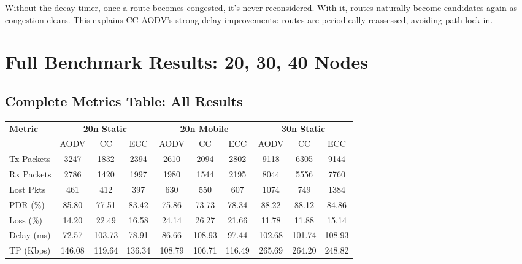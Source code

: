 \documentclass[12pt]{article}
\begin{document}
\noindent
Without the decay timer, once a route becomes congested, it's never reconsidered. With it, routes naturally become candidates again as congestion clears. This explains CC-AODV's strong delay improvements: routes are periodically reassessed, avoiding path lock-in.

\section*{Full Benchmark Results: 20, 30, 40 Nodes}

\subsection*{Complete Metrics Table: All Results}

\begin{center}
\begin{tabular}{l|ccc|ccc|ccc}
\toprule
\textbf{Metric} & \multicolumn{3}{c}{\textbf{20n Static}} & \multicolumn{3}{c}{\textbf{20n Mobile}} & \multicolumn{3}{c}{\textbf{30n Static}} \\
 & AODV & CC & ECC & AODV & CC & ECC & AODV & CC & ECC \\
\midrule
Tx Packets & 3247 & 1832 & 2394 & 2610 & 2094 & 2802 & 9118 & 6305 & 9144 \\
Rx Packets & 2786 & 1420 & 1997 & 1980 & 1544 & 2195 & 8044 & 5556 & 7760 \\
Lost Pkts & 461 & 412 & 397 & 630 & 550 & 607 & 1074 & 749 & 1384 \\
PDR (\%) & 85.80 & 77.51 & 83.42 & 75.86 & 73.73 & 78.34 & 88.22 & 88.12 & 84.86 \\
Loss (\%) & 14.20 & 22.49 & 16.58 & 24.14 & 26.27 & 21.66 & 11.78 & 11.88 & 15.14 \\
Delay (ms) & 72.57 & 103.73 & 78.91 & 86.66 & 108.93 & 97.44 & 102.68 & 101.74 & 108.93 \\
TP (Kbps) & 146.08 & 119.64 & 136.34 & 108.79 & 106.71 & 116.49 & 265.69 & 264.20 & 248.82 \\
\bottomrule
\end{tabular}
\end{center}

\pagebreak
\end{document}
